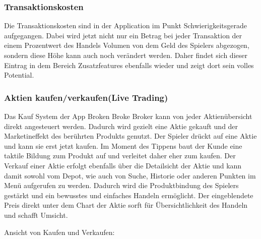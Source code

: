 \documentclass[10pt]{scrartcl}
\begin{document}
\subsubsection{Transaktionskosten}

Die Transaktionskosten sind in der Application im Punkt Schwierigkeitsgerade aufgegangen. Dabei wird jetzt nicht nur ein Betrag bei jeder Transaktion der einem Prozentwert des Handels Volumen von dem Geld des Spielers abgezogen, sondern diese Höhe kann auch noch verändert werden. Daher findet sich dieser Eintrag in dem Bereich Zusatzfeatures ebenfalls wieder und zeigt dort sein volles Potential.

\subsubsection{Aktien kaufen/verkaufen(Live Trading)}

Das Kauf System der App Broken Broke Broker kann von jeder Aktienübersicht direkt angesteuert werden. Dadurch wird gezielt eine Aktie gekauft und der Marketineffekt des berührten Produkts genutzt. Der Spieler drückt auf eine Aktie und kann sie erst jetzt kaufen. Im Moment des Tippens baut der Kunde eine taktile Bildung zum Produkt auf und verleitet daher eher zum kaufen. Der Verkauf einer Aktie erfolgt ebenfalls über die Detailsicht der Aktie und kann damit sowohl vom Depot, wie auch von Suche, Historie oder anderen Punkten im Menü aufgerufen zu werden. Dadurch wird die Produktbindung des Spielers gestärkt und ein bewusstes und einfaches Handeln ermöglicht. Der eingeblendete Preis direkt unter dem Chart der Aktie sorft für Übersichtlichkeit des Handeln und schafft Umsicht.

Ansicht von Kaufen und Verkaufen:
\end{document}
